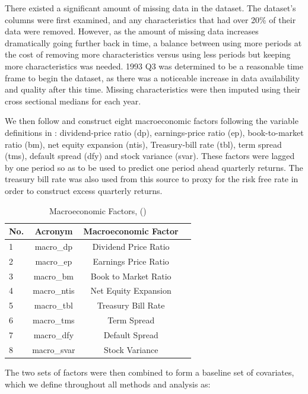 \documentclass[11pt, a4paper, table]{article}
\begin{document}
There existed a significant amount of missing data in the dataset. The dataset's columns were first examined, and any characteristics that had over 20\% of their data were removed. However, as the amount of missing data increases dramatically going further back in time, a balance between using more periods at the cost of removing more characteristics versus using less periods but keeping more characteristics was needed. 1993 Q3 was determined to be a reasonable time frame to begin the dataset, as there was a noticeable increase in data availability and quality after this time.  Missing characteristics were then imputed using their cross sectional medians for each year. 

We then follow \cite{gu_empirical_2018} and construct eight macroeconomic factors following the variable definitions in \cite{welch_comprehensive_2008}: dividend-price ratio (dp), earnings-price ratio (ep), book-to-market ratio (bm), net equity expansion (ntis), Treasury-bill rate (tbl), term spread (tms), default spread (dfy) and stock variance (svar). These factors were lagged by one period so as to be used to predict one period ahead quarterly returns. The treasury bill rate was also used from this source to proxy for the risk free rate in order to construct excess quarterly returns. 

\begin{table}
	\caption{Macroeconomic Factors, (\cite{welch_comprehensive_2008})}
	\begin{center}
		\begin{tabular}{lccc} \hline
			No. & Acronym & Macroeconomic Factor \\ \hline
			1 & macro\_dp & Dividend Price Ratio \\
			2 & macro\_ep & Earnings Price Ratio \\
			3 & macro\_bm & Book to Market Ratio \\
			4 & macro\_ntis & Net Equity Expansion \\
			5 & macro\_tbl & Treasury Bill Rate \\
			6 & macro\_tms & Term Spread \\
			7 & macro\_dfy & Default Spread \\
			8 & macro\_svar & Stock Variance \\ \hline
		\end{tabular}
	\end{center}
\end{table}

The two sets of factors were then combined to form a baseline set of covariates, which we define throughout all methods and analysis as:
\end{document}
